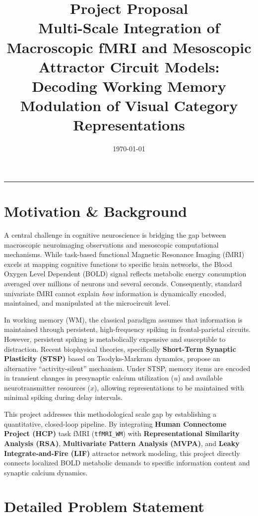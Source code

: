 \documentclass[11pt,a4paper]{article}
\title{\textbf{Project Proposal}\\[0.5em] 
\Large Multi-Scale Integration of Macroscopic fMRI and Mesoscopic Attractor Circuit Models: Decoding Working Memory Modulation of Visual Category Representations}
\author{}
\date{\today}
\begin{document}
\maketitle

\hrule
\vspace{1em}

\section{Motivation \& Background}

A central challenge in cognitive neuroscience is bridging the gap between macroscopic neuroimaging observations and mesoscopic computational mechanisms. While task-based functional Magnetic Resonance Imaging (fMRI) excels at mapping cognitive functions to specific brain networks, the Blood Oxygen Level Dependent (BOLD) signal reflects metabolic energy consumption averaged over millions of neurons and several seconds. Consequently, standard univariate fMRI cannot explain \textit{how} information is dynamically encoded, maintained, and manipulated at the microcircuit level.

In working memory (WM), the classical paradigm assumes that information is maintained through persistent, high-frequency spiking in frontal-parietal circuits. However, persistent spiking is metabolically expensive and susceptible to distraction. Recent biophysical theories, specifically \textbf{Short-Term Synaptic Plasticity (STSP)} based on Tsodyks-Markram dynamics, propose an alternative ``activity-silent'' mechanism. Under STSP, memory items are encoded in transient changes in presynaptic calcium utilization ($u$) and available neurotransmitter resources ($x$), allowing representations to be maintained with minimal spiking during delay intervals.

This project addresses this methodological scale gap by establishing a quantitative, closed-loop pipeline. By integrating \textbf{Human Connectome Project (HCP)} task fMRI (\texttt{tfMRI\_WM}) with \textbf{Representational Similarity Analysis (RSA)}, \textbf{Multivariate Pattern Analysis (MVPA)}, and \textbf{Leaky Integrate-and-Fire (LIF)} attractor network modeling, this project directly connects localized BOLD metabolic demands to specific information content and synaptic calcium dynamics.

\section{Detailed Problem Statement}
\end{document}
